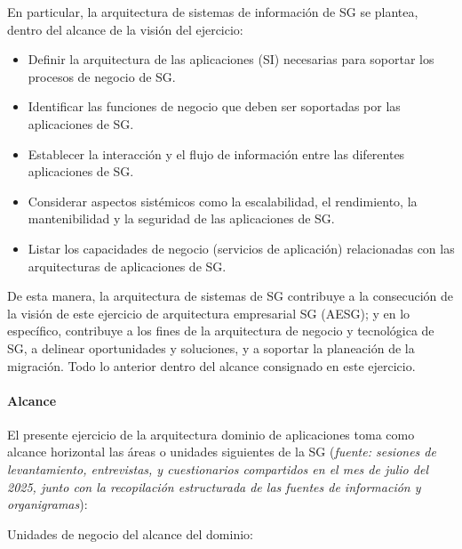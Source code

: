 \documentclass[
	a4paper, %
	12pt, %
]{include/CSSullivanBusinessReport}
\def\tightlist{}
\begin{document}
En particular, la arquitectura de sistemas de información de SG se
plantea, dentro del alcance de la visión del ejercicio:

\begin{itemize}
\tightlist
\item
  Definir la arquitectura de las aplicaciones (SI) necesarias para
  soportar los procesos de negocio de SG.
\item
  Identificar las funciones de negocio que deben ser soportadas por las
  aplicaciones de SG.
\item
  Establecer la interacción y el flujo de información entre las
  diferentes aplicaciones de SG.
\item
  Considerar aspectos sistémicos como la escalabilidad, el rendimiento,
  la mantenibilidad y la seguridad de las aplicaciones de SG.
\item
  Listar los capacidades de negocio (servicios de aplicación)
  relacionadas con las arquitecturas de aplicaciones de SG.
\end{itemize}

De esta manera, la arquitectura de sistemas de SG contribuye a la
consecución de la visión de este ejercicio de arquitectura empresarial
SG (AESG); y en lo específico, contribuye a los fines de la arquitectura
de negocio y tecnológica de SG, a delinear oportunidades y soluciones, y
a soportar la planeación de la migración. Todo lo anterior dentro del
alcance consignado en este ejercicio.

\paragraph{Alcance}\label{sec:alcance}

El presente ejercicio de la arquitectura dominio de aplicaciones toma
como alcance horizontal las áreas o unidades siguientes de la SG
(\emph{fuente: sesiones de levantamiento, entrevistas, y cuestionarios
compartidos en el mes de julio del 2025, junto con la recopilación
estructurada de las fuentes de información y organigramas}):

Unidades de negocio del alcance del dominio:
\end{document}
